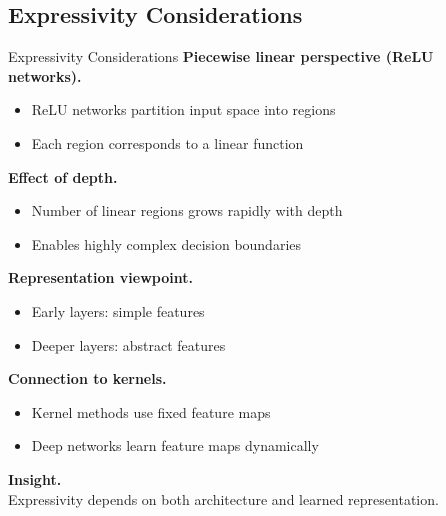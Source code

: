 \documentclass[aspectratio=169,11pt]{beamer}
\begin{document}
\subsection{Expressivity Considerations}
\begin{frame}[t,allowframebreaks]{Expressivity Considerations}
\small
\textbf{Piecewise linear perspective (ReLU networks).}\\ \begin{itemize}
    \item ReLU networks partition input space into regions
    \item Each region corresponds to a linear function
\end{itemize}

\textbf{Effect of depth.}\\ \begin{itemize}
    \item Number of linear regions grows rapidly with depth
    \item Enables highly complex decision boundaries
\end{itemize}

\textbf{Representation viewpoint.}\\ \begin{itemize}
    \item Early layers: simple features
    \item Deeper layers: abstract features
\end{itemize}

\textbf{Connection to kernels.}\\ \begin{itemize}
    \item Kernel methods use fixed feature maps
    \item Deep networks learn feature maps dynamically
\end{itemize}

\textbf{Insight.}\\ Expressivity depends on both architecture and learned representation.
\end{frame}
\end{document}
